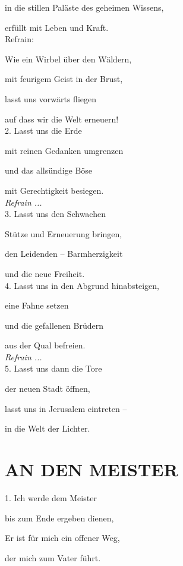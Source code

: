 \documentclass[11pt,a5paper,twoside]{article}
\begin{document}
in die stillen Paläste des geheimen Wissens,
 
erfüllt mit Leben und Kraft.\\
 
 
Refrain: 

Wie ein Wirbel über den Wäldern,
 
mit feurigem Geist in der Brust, 
  
lasst uns vorwärts fliegen 

auf dass wir die Welt erneuern!\\
 
 
2. Lasst uns die Erde
 
mit reinen Gedanken umgrenzen 
  
und das allsündige Böse

mit Gerechtigkeit besiegen.\\

\textit{Refrain ...}\\

3. Lasst uns den Schwachen

Stütze und Erneuerung bringen,

den Leidenden -- Barmherzigkeit

und die neue Freiheit.\\

4. Lasst uns in den Abgrund hinabsteigen,

eine Fahne setzen

und die gefallenen Brüdern

aus der Qual befreien.\\

\textit{Refrain ...}\\

5. Lasst uns dann die Tore

der neuen Stadt öffnen,

lasst uns in Jerusalem eintreten --

in die Welt der Lichter. \\


\section[An den Meister]{AN DEN MEISTER}

1. Ich werde dem Meister 

bis zum Ende ergeben dienen, 

Er ist für mich ein offener Weg, 

der mich zum Vater führt.\\
\end{document}
